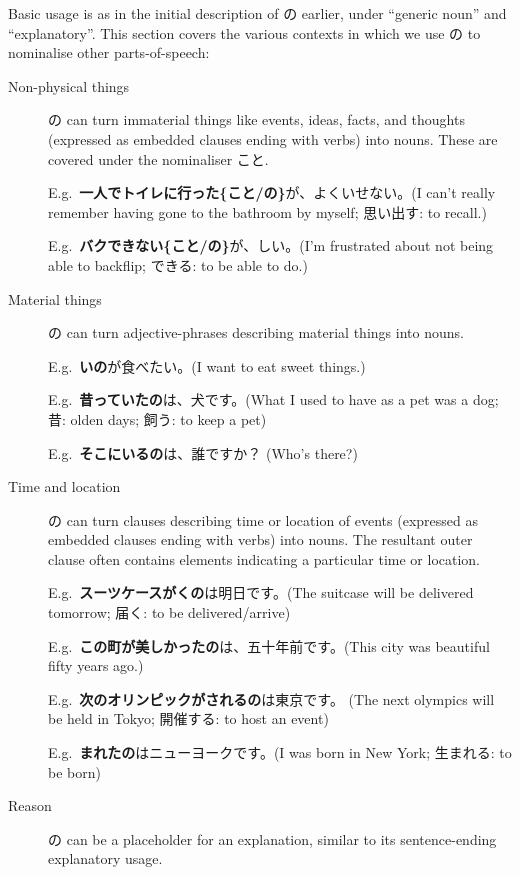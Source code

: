 \documentclass[../nihongo-gakushuu-kyouzai.tex]{subfiles}
\begin{document}
Basic usage is as in the initial description of の earlier, under ``generic noun'' and ``explanatory''. This section covers the various contexts in which we use の to nominalise other parts-of-speech:
\begin{description}
    \item[Non-physical things] の can turn immaterial things like events, ideas, facts, and thoughts (expressed as embedded clauses ending with verbs) into nouns. These are covered under the nominaliser こと.

    E.g.\ \textbf{一人でトイレに行った\{こと/の\}}が、よくいせない。(I can't really remember having gone to the bathroom by myself; 思い出す: to recall.)

    E.g.\ \textbf{バクできない\{こと/の\}}が、しい。(I'm frustrated about not being able to backflip; できる: to be able to do.)

    \item[Material things] の can turn adjective-phrases describing material things into nouns.

    E.g.\ \textbf{いの}が食べたい。(I want to eat sweet things.)

    E.g.\ \textbf{昔っていたの}は、犬です。(What I used to have as a pet was a dog; 昔: olden days; 飼う: to keep a pet)

    E.g.\ \textbf{そこにいるの}は、誰ですか？ (Who's there?)

    \item[Time and location] の can turn clauses describing time or location of events (expressed as embedded clauses ending with verbs) into nouns. The resultant outer clause often contains elements indicating a particular time or location.

    E.g.\ \textbf{スーツケースがくの}は明日です。(The suitcase will be delivered tomorrow; 届く: to be delivered/arrive)

    E.g.\ \textbf{この町が美しかったの}は、五十年前です。(This city was beautiful fifty years ago.)

    E.g.\ \textbf{次のオリンピックがされるの}は東京です。 (The next olympics will be held in Tokyo; 開催する: to host an event)

    E.g.\ \textbf{まれたの}はニューヨークです。(I was born in New York; 生まれる: to be born)

    \item[Reason] の can be a placeholder for an explanation, similar to its sentence-ending explanatory usage.


\end{description}
\end{document}
